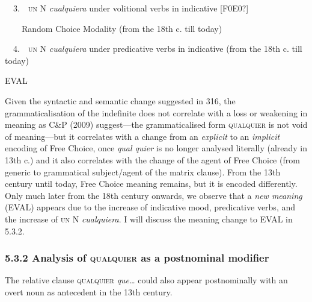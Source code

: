 \begin{styleStandard}
\ \ 3.\ \ \textsc{un} N\textit{ cualquiera }under volitional verbs in indicative [F0E0?]
\end{styleStandard}

\begin{styleListParagraph}
\textmd{\ \ \ \ Random Choice Modality (from the 18th c. till today)}
\end{styleListParagraph}

\begin{styleStandard}
\ \ 4.\ \ \textsc{un} N\textit{ cualquiera} under predicative verbs in indicative (from the 18th c. till today)
\end{styleStandard}

\begin{styleStandard}
EVAL
\end{styleStandard}

\begin{styleStandard}
Given the syntactic and semantic change suggested in 316, the grammaticalisation of the indefinite does not correlate with a loss or weakening in meaning as C\&P (2009) suggest—the grammaticalised form \textsc{qualquier} is not void of meaning—but it correlates with a change from an \textit{explicit }to an\textit{ implicit }encoding of Free Choice, once \textit{qual quier} is no longer analysed literally (already in 13th c.) and it also correlates with the change of the agent of Free Choice (from generic to grammatical subject/agent of the matrix clause). From the 13th century until today, Free Choice meaning remains, but it is encoded differently. Only much later from the 18th century onwards, we observe that a \textit{new meaning} (EVAL) appears due to the increase of indicative mood, predicative verbs, and the increase of \textsc{un} N \textit{cualquiera}. I will discuss the meaning change to EVAL in 5.3.2.
\end{styleStandard}

\subsubsection[5.3.2 Analysis of qualquier as a postnominal modifier]{\textbf{5.3.2 Analysis of }\textbf{\textsc{qualquier}}\textbf{ as a postnominal modifier}}
\begin{styleStandard}
The relative clause \textsc{qualquier}\textit{ que…} could also appear postnominally with an overt noun as antecedent in the 13th century.
\end{styleStandard}

